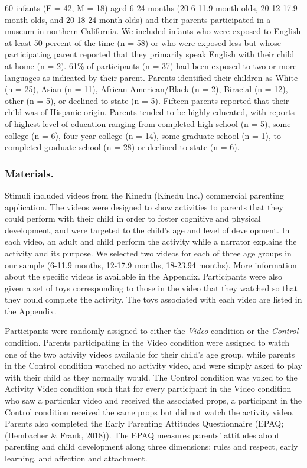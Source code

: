 \documentclass[10pt, letterpaper]{article}
\begin{document}
60 infants (F = 42, M = 18) aged 6-24 months (20 6-11.9 month-olds, 20
12-17.9 month-olds, and 20 18-24 month-olds) and their parents
participated in a museum in northern California. We included infants who
were exposed to English at least 50 percent of the time (n = 58) or who
were exposed less but whose participating parent reported that they
primarily speak English with their child at home (n = 2). 61\% of
participants (n = 37) had been exposed to two or more languages as
indicated by their parent. Parents identified their children as White (n
= 25), Asian (n = 11), African American/Black (n = 2), Biracial (n =
12), other (n = 5), or declined to state (n = 5). Fifteen parents
reported that their child was of Hispanic origin. Parents tended to be
highly-educated, with reports of highest level of education ranging from
completed high school (n = 5), some college (n = 6), four-year college
(n = 14), some graduate school (n = 1), to completed graduate school (n
= 28) or declined to state (n = 6).

\subsubsection{Materials.}\label{materials.}

Stimuli included videos from the Kinedu (Kinedu Inc.) commercial
parenting application. The videos were designed to show activities to
parents that they could perform with their child in order to foster
cognitive and physical development, and were targeted to the child's age
and level of development. In each video, an adult and child perform the
activity while a narrator explains the activity and its purpose. We
selected two videos for each of three age groups in our sample (6-11.9
months, 12-17.9 months, 18-23.94 months). More information about the
specific videos is available in the Appendix. Participants were also
given a set of toys corresponding to those in the video that they
watched so that they could complete the activity. The toys associated
with each video are listed in the Appendix.

Participants were randomly assigned to either the \emph{Video} condition
or the \emph{Control} condition. Parents participating in the Video
condition were assigned to watch one of the two activity videos
available for their child's age group, while parents in the Control
condition watched no activity video, and were simply asked to play with
their child as they normally would. The Control condition was yoked to
the Activity Video condition such that for every participant in the
Video condition who saw a particular video and received the associated
props, a participant in the Control condition received the same props
but did not watch the activity video. Parents also completed the Early
Parenting Attitudes Questionnaire (EPAQ; (Hembacher \& Frank, 2018)).
The EPAQ measures parents' attitudes about parenting and child
development along three dimensions: rules and respect, early learning,
and affection and attachment.
\end{document}
